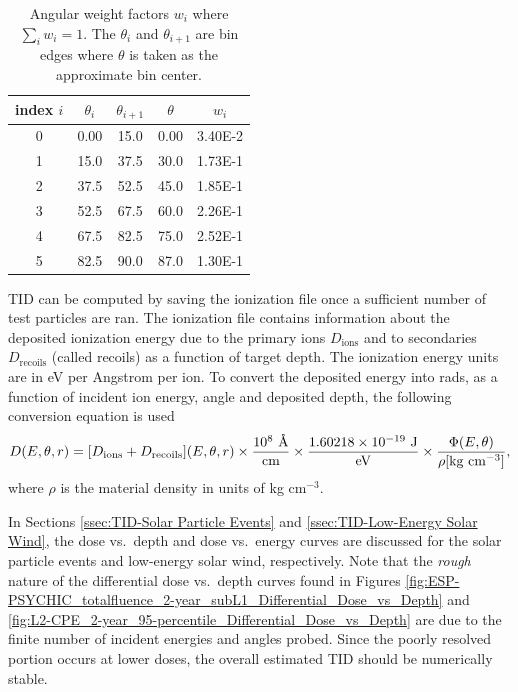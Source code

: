 \documentclass{hitec}
\newcommand{\angstrom}{\mbox{\normalfont\AA}}
\begin{document}
\begin{table}[h]\centering
	\caption{Angular weight factors $w_i$ where $\sum_i w_i = 1$. The $\theta_i$ and $\theta_{i+1}$ are bin edges where $\theta$ is taken as the approximate bin center.}\label{tab:incidentAngleBins}
	\begin{tabular}{|c | c | c | c | c |}\hline
		index $i$ & $\theta_i$ & $\theta_{i+1}$ & $\theta$ & $w_i$ \\\hline
		0  & 0.00 & 15.0 & 0.00 & 3.40E-2 \\\hline
		1  & 15.0 & 37.5 & 30.0 & 1.73E-1 \\\hline
		2  & 37.5 & 52.5 & 45.0 & 1.85E-1\\\hline
		3  & 52.5 & 67.5 & 60.0 & 2.26E-1 \\\hline
		4  & 67.5 & 82.5 & 75.0 & 2.52E-1\\\hline
		5  & 82.5 & 90.0 & 87.0 & 1.30E-1\\\hline
	\end{tabular}
\end{table}

TID can be computed by saving the ionization file once a sufficient number of test particles are ran. The ionization file contains information about the deposited ionization energy due to the primary ions $D_{\text{ions}}$ and to secondaries $D_{\text{recoils}}$ (called recoils) as a function of target depth. The ionization energy units are in eV per Angstrom per ion. To convert the deposited energy into rads, as a function of incident ion energy, angle and deposited depth, the following conversion equation is used
\begin{equation}
	D(E,\theta,r) = [D_{\text{ions}} + D_{\text{recoils}}](E,\theta,r) \times \frac{10^8 \text{ \si{\angstrom}}}{\text{cm}} \times \frac{1.60218\times 10^{-19} \text{ J}}{\text{eV}} \times \frac{\Phi(E,\theta)}{\rho[\text{kg cm$^{-3}$}]} ,
\end{equation}
where $\rho$ is the material density in units of kg cm$^{-3}$.

In Sections \ref{ssec:TID-Solar Particle Events} and \ref{ssec:TID-Low-Energy Solar Wind}, the dose vs.\ depth and dose vs.\ energy curves are discussed for the solar particle events and low-energy solar wind, respectively. Note that the \textit{rough} nature of the differential dose vs.\ depth curves found in Figures \ref{fig:ESP-PSYCHIC_totalfluence_2-year_subL1_Differential_Dose_vs_Depth} and \ref{fig:L2-CPE_2-year_95-percentile_Differential_Dose_vs_Depth} are due to the finite number of incident energies and angles probed. Since the poorly resolved portion occurs at lower doses, the overall estimated TID should be numerically stable.
\end{document}
